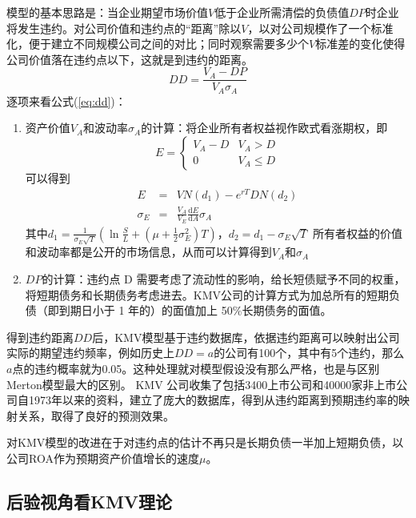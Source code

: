 \documentclass[a4paper,12pt]{ctexart}
\begin{document}
模型的基本思路是：当企业期望市场价值$V$低于企业所需清偿的负债值$DP$时企业将发生违约。对公司价值和违约点的“距离”除以$V$，以对公司规模作了一个标准化，便于建立不同规模公司之间的对比；同时观察需要多少个$V$标准差的变化使得公司价值落在违约点以下，这就是到违约的距离。
\begin{equation}
    DD=\frac{V_A-DP}{V_A\sigma_A}\label{eq:dd}
\end{equation}
逐项来看公式(\ref{eq:dd})：
\begin{enumerate}
    \item 资产价值$V_A$和波动率$\sigma_A$的计算：将企业所有者权益视作欧式看涨期权，即\begin{equation*}
              E=\begin{cases}
                  V_A-D & V_A>D    \\
                  0     & V_A\le D
              \end{cases}
          \end{equation*}
          可以得到\begin{eqnarray}
              E&=&VN(d_1)-e^{rT}DN(d_2)\label{eq:ee}\\
              \sigma_E&=&\frac{V_A}{V_E} \frac{\mathrm{d}E}{\mathrm{d}A}\sigma_A
          \end{eqnarray}其中$d_1=\frac{1}{\sigma_E\sqrt{T}}(\ln \frac{S}{L}+(\mu+\frac{1}{2}\sigma^2_E)T)$，$d_2=d_1-\sigma_E\sqrt{T}$
          所有者权益的价值和波动率都是公开的市场信息，从而可以计算得到$V_A$和$\sigma_A$
    \item $DP$的计算：违约点 D 需要考虑了流动性的影响，给长短债赋予不同的权重，将短期债务和长期债务考虑进去。KMV公司的计算方式为加总所有的短期负债（即到期日小于 1 年的）的面值加上 50\%长期债务的面值。
\end{enumerate}

得到违约距离$DD$后，KMV模型基于违约数据库，依据违约距离可以映射出公司实际的期望违约频率，例如历史上$DD=a$的公司有100个，其中有5个违约，那么$a$点的违约概率就为0.05。这种处理就对模型假设没有那么严格，也是与区别Merton模型最大的区别。 KMV 公司收集了包括3400上市公司和40000家非上市公司自1973年以来的资料，建立了庞大的数据库，得到从违约距离到预期违约率的映射关系，取得了良好的预测效果。

\citet{彭伟2012基于}对KMV模型的改进在于对违约点的估计不再只是长期负债一半加上短期负债，以公司ROA作为预期资产价值增长的速度$\mu$。

\subsection*{后验视角看KMV理论}
\end{document}
